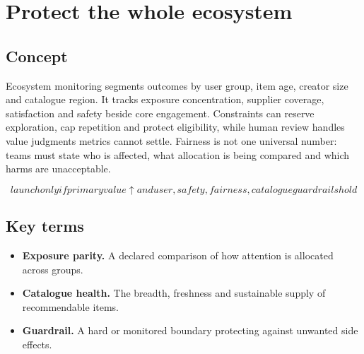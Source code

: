 \section{Protect the whole ecosystem}

\begin{abstract}
Healthy systems create value for users without silently starving parts of the catalogue.
\end{abstract}

\subsection{Concept}
Ecosystem monitoring segments outcomes by user group, item age, creator size and catalogue region. It tracks exposure concentration, supplier coverage, satisfaction and safety beside core engagement. Constraints can reserve exploration, cap repetition and protect eligibility, while human review handles value judgments metrics cannot settle. Fairness is not one universal number: teams must state who is affected, what allocation is being compared and which harms are unacceptable.

\begin{equation*}
launch only if primary value ↑ and user, safety, fairness, catalogue guardrails hold
\end{equation*}

\subsection{Key terms}
\begin{itemize}
\item \textbf{Exposure parity.} A declared comparison of how attention is allocated across groups.
\item \textbf{Catalogue health.} The breadth, freshness and sustainable supply of recommendable items.
\item \textbf{Guardrail.} A hard or monitored boundary protecting against unwanted side effects.
\end{itemize}
